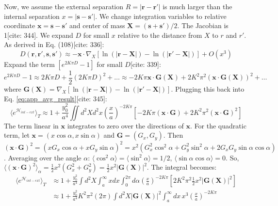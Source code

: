 \documentclass[11pt]{article}
\begin{document}
Now, we assume the external separation $R=|\mathbf{r}-\mathbf{r}'|$ is much larger than the internal separation $x = |\mathbf{s}-\mathbf{s}'|$. We change integration variables to relative coordinate $\mathbf{x} = \mathbf{s}-\mathbf{s}'$ and center of mass $\mathbf{X} = (\mathbf{s}+\mathbf{s}')/2$. The Jacobian is 1[cite: 344]. We expand $D$ for small $x$ relative to the distance from $X$ to $r$ and $r'$. As derived in Eq. (108)[cite: 336]:
\begin{equation}
D(\mathbf{r},\mathbf{r}',\mathbf{s},\mathbf{s}') \approx -\mathbf{x} \cdot \nabla_X [\ln(|\mathbf{r}-\mathbf{X}|) - \ln(|\mathbf{r}'-\mathbf{X}|)] + O(x^3)
\end{equation}
Expand the term $[e^{2K\pi D} - 1]$ for small $D$[cite: 339]:
\begin{equation}
e^{2K\pi D} - 1 \approx 2K\pi D + \frac{1}{2}(2K\pi D)^2 + \dots \approx -2K\pi \mathbf{x} \cdot \mathbf{G}(\mathbf{X}) + 2 K^2 \pi^2 (\mathbf{x} \cdot \mathbf{G}(\mathbf{X}))^2 + \dots
\end{equation}
where $\mathbf{G}(\mathbf{X}) = \nabla_X [\ln(|\mathbf{r}-\mathbf{X}|) - \ln(|\mathbf{r}'-\mathbf{X}|)]$.
Plugging this back into Eq. \eqref{eq:app_avg_result}[cite: 345]:
\begin{equation}
\langle e^{\mathcal{H}_{int-ext}} \rangle_T \approx 1 + \frac{y_0^2}{a^4} \iint d^2X d^2x \left(\frac{x}{a}\right)^{-2K\pi} \left[ -2K\pi (\mathbf{x} \cdot \mathbf{G}) + 2K^2\pi^2 (\mathbf{x} \cdot \mathbf{G})^2 \right]
\end{equation}
The term linear in $\mathbf{x}$ integrates to zero over the directions of $\mathbf{x}$. For the quadratic term, let $\mathbf{x} = (x \cos\alpha, x \sin\alpha)$ and $\mathbf{G} = (G_x, G_y)$. Then $(\mathbf{x} \cdot \mathbf{G})^2 = (x G_x \cos\alpha + x G_y \sin\alpha)^2 = x^2 (G_x^2 \cos^2\alpha + G_y^2 \sin^2\alpha + 2 G_x G_y \sin\alpha \cos\alpha)$. Averaging over the angle $\alpha$: $\langle \cos^2\alpha \rangle = \langle \sin^2\alpha \rangle = 1/2$, $\langle \sin\alpha \cos\alpha \rangle = 0$. So, $\langle (\mathbf{x} \cdot \mathbf{G})^2 \rangle_{\alpha} = \frac{1}{2} x^2 (G_x^2 + G_y^2) = \frac{1}{2} x^2 |\mathbf{G}(\mathbf{X})|^2$.
The integral becomes:
\begin{align}
\langle e^{\mathcal{H}_{int-ext}} \rangle_T &\approx 1 + \frac{y_0^2}{a^4} \int d^2X \int_{a}^{\infty} x dx \int_0^{2\pi} d\alpha \left(\frac{x}{a}\right)^{-2K\pi} [2 K^2 \pi^2 \frac{1}{2} x^2 |\mathbf{G}(\mathbf{X})|^2] \\
&\approx 1 + \frac{y_0^2}{a^4} K^2 \pi^2 (2\pi) \int d^2X |\mathbf{G}(\mathbf{X})|^2 \int_a^{\infty} dx \, x^3 \left(\frac{x}{a}\right)^{-2K\pi} \label{eq:app_almost_there}
\end{align}
\end{document}
